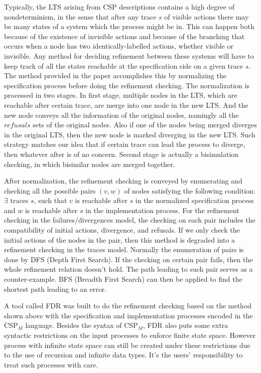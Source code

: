 \documentclass{llncs}
\newcommand{\cspm}{CSP$_M$}
\begin{document}
Typically, the LTS arising from CSP descriptions contains a high degree of
nondeterminism, in the sense that after any trace $s$ of visible actions there may
be many states of a system which the process might be in. This can happen both
because of the existence of invisible actions and because of the branching that
occurs when a node has two identically-labelled actions, whether visible or
invisible. Any method for deciding refinement between these systems will have
to keep track of all the states reachable at the specification side on a given
trace $s$. The method provided in the paper accomplishes this by normalizing the
specification process before doing the refinement checking. The normalization
is processed in two stages. In first stage, multiple nodes in the LTS, which 
are reachable after certain trace, are merge into one node in the new LTS. And
the new node conveys all the information of the original nodes, namingly all the
$refusals$ sets of the original nodes. Also if one of the nodes being merged
diverges in the original LTS, then the new node is marked diverging in the new
LTS. Such strategy matches our idea that if certain trace can lead the process
to diverge, then whatever after is of no concern. Second stage is actually a
bisimulation checking, in which bisimilar nodes are merged together.

After normalization, the refinement checking is conveyed by enumerating and
checking all the
possible pairs $(v, w)$ of nodes satisfying the following condition: $\exists$
traces $s$, such that $v$ is reachable after $s$ in
the normalized specification process and $w$ is reachable after $s$ in
the implementation process. For the refinement checking in the
failures/divergences model, the checking on each pair includes the compatibility
of initial actions, divergence, and refusals. If we only check the initial
actions of the nodes in the pair, then this method is degraded into a refinement
checking in the traces model. Normally the enumeration of pairs is done by DFS
(Depth First Search). If the checking on certain pair fails, then the whole
refinement relation doesn't hold. The path leading to such pair serves as a
counter-example. BFS (Breadth First Search) can then be applied to find the
shortest path leading to an error.

A tool called FDR was built to do the refinement checking based on the method
shown above with the specification and implementation processes encoded in
the \cspm{} language. Besides the syntax of \cspm, FDR also puts some extra 
syntactic restrictions on the input processes to enforce finite state space.
However process with infinite state space can still be created under these
restrictions due to the use of recursion and infinite data types. It's the
users' responsibility to treat such processes with care.
\end{document}
